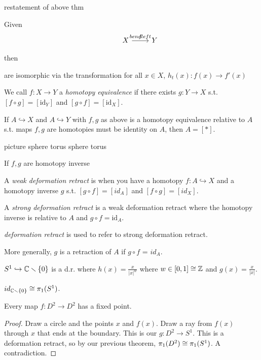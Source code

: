 \documentclass[11pt,leqno,oneside]{amsart}
\numberwithin{thm}{section}
\newcommand{\of}{\circ}
\newcommand{\minus}{\smallsetminus}
\newcommand{\fund}{\pi_1}
\newcommand{\into}{\hookrightarrow}
\newcommand{\id}{\text{id}}
\newcommand{\de}{\emph}
\begin{document}
\begin{thm}
  restatement of above thm

  Given
  $$\begin{tikzcd}
    &X \arrow[r, "f", "bend left"] &Y %
  \end{tikzcd}$$

  then



  are isomorphic  via the transformation
  for all $x \in X$, $h_t(x)\colon f(x) \to f'(x)$
\end{thm}
\begin{defn}
  We call $f:X \to Y$ a \de{homotopy equivalence} if there exists $g\colon Y \to X$ s.t. $[f \of g] = [\id_Y]$ and $[g \of f] = [\id_X]$.
\end{defn}
\begin{rmk}
  If $A \into X$ and $A \into Y$ with $f,g$ as above is a homotopy equivalence relative to $A$ s.t. maps $f,g$ are homotopies must be identity on $A$, then $A = [*]$.

  picture
  sphere torus
  sphere torus

  If $f,g$ are homotopy inverse

\end{rmk}
\begin{defn}
  A \de{weak deformation retract} is when you have a homotopy $f: A \into X$ and a homotopy inverse $g$ s.t. $[g \of f] = [id_A]$ and $[f \of g] = [id_X]$.
\end{defn}
\begin{defn}
  A \de{strong deformation retract} is a weak deformation retract where the homotopy inverse is relative to $A$ and $g \of f = \id_A$.
\end{defn}
\begin{rmk}
  \de{deformation retract} is used to refer to strong deformation retract.
\end{rmk}
\begin{rmk}
  More generally, $g$ is a retraction of $A$ if $g \of f$ = $id_A$.
\end{rmk}
\begin{example}
  $S^1 \into \C\minus\{0\}$ is a d.r. where $h(x) = \frac{x}{|x|^w}$ where $w \in [0,1] \mathrel{\cong} {\mathbb Z}$  and $g(x) = \frac{x}{|x|}$.

  $id_{\C\minus\{0\}} \isom \fund(S^1)$.
\end{example}
\begin{thm}
  Every map $f\colon D^2 \to D^2$ has a fixed point.
\end{thm}



\begin{proof}
  Draw a circle and the points $x$ and $f(x)$.  Draw a ray from $f(x)$ through $x$ that ends at the boundary.  This is our $g\colon D^2 \to S^1$.  This is a deformation retract, so by our previous theorem, $\fund(D^2) \isom \fund(S^1)$.  A contradiction.
\end{proof}
\end{document}
